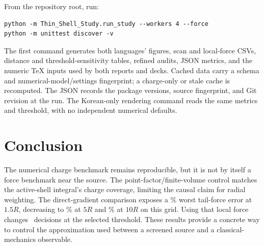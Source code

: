 \documentclass[11pt,a4paper]{article}
\begin{document}
From the repository root, run:
\begin{verbatim}
python -m Thin_Shell_Study.run_study --workers 4 --force
python -m unittest discover -v
\end{verbatim}
The first command generates both languages' figures, scan and local-force CSVs,
distance and threshold-sensitivity tables, refined audits, JSON metrics, and
the numeric TeX inputs used by both reports and decks. Cached data carry a
schema and numerical-model/settings fingerprint; a charge-only or stale cache
is recomputed. The JSON records the package versions, source fingerprint, and
Git revision at the run. The Korean-only rendering command reads the same
metrics and threshold, with no independent numerical defaults.

\section{Conclusion}
The numerical charge benchmark remains reproducible, but it is not by itself
a force benchmark near the source. The point-factor/finite-volume control
matches the active-shell integral's charge coverage, limiting the causal claim
for radial weighting. The direct-gradient comparison exposes a
\StudyForceNearMax\% worst tail-force error at $1.5R$, decreasing to
\StudyForceFiveMax\% at $5R$ and \StudyForceTenMax\% at $10R$ on this grid.
Using that local force changes \StudyTailFlips\ decisions at the selected
threshold. These results provide a concrete way to control the approximation
used between a screened source and a classical-mechanics observable.

\clearpage

\end{document}
